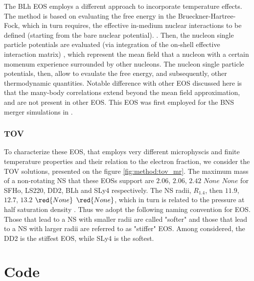 The BLh EOS employs a different approach to incorporate temperature effects.
The method is based on evaluating the free energy in the Brueckner-Hartree-Fock, which in turn requires,
the effective in-medium nuclear interactions to be defined (starting from the bare nuclear potential).
.
Then, the nucleon single particle potentials are evaluated (via integration of the on-shell effective interaction matrix)
, which represent the mean field that a nucleon with a certain momenum experience surrounded by other nucleons.
The nucleon single particle potentials, then, allow to evaulate the free energy, and subsequently, 
other thermodynamic quantities.
Notable difference with other EOS discussed here is that the many-body correlations extend beyond the mean field approximation, and are not present in other EOS. 
This EOS was first employed for the BNS merger simulations in \cite{Bernuzzi:2020txg}.

\subsubsection{TOV}

To characterize these EOS, that employs very different microphyscis and finite temperature properties and their relation to the electron fraction, we consider the TOV solutions, presented on the figure \ref{fig:method:tov_mr}.
The maximum mass of a non-rotating NS that these EOSs support are $2.06$, $2.06$, $2.42$ $None$ $None$ 
for SFHo, LS220, DD2, BLh and SLy4 respectively. The NS radii, $R_{1.4}$, then $11.9$, $12.7$, $13.2$ $\red{None}$ $\red{None}$, which in turn is related to the pressure at half saturation density \cite{Lattimer:2012nd}. Thus we adopt the following naming convention for EOS. Those that lead to a NS with smaller radii are called "softer" and those that lead to a NS with larger radii are referred to as "stiffer" EOS.
Among considered, the DD2 is the stiffest EOS, while SLy4 is the softest.



\section{Code}


